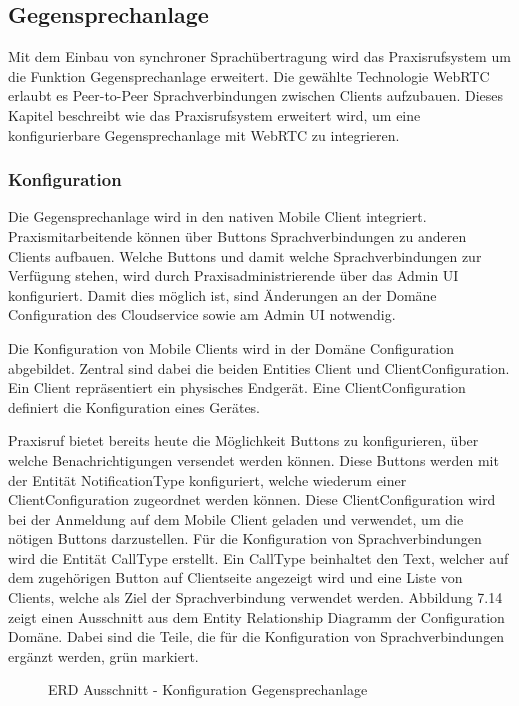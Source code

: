 \subsection{Gegensprechanlage}

Mit dem Einbau von synchroner Sprachübertragung wird das Praxisrufsystem um die Funktion Gegensprechanlage erweitert.
Die gewählte Technologie WebRTC erlaubt es Peer-to-Peer Sprachverbindungen zwischen Clients aufzubauen.
Dieses Kapitel beschreibt wie das Praxisrufsystem erweitert wird, um eine konfigurierbare Gegensprechanlage mit WebRTC zu integrieren.

\subsubsection{Konfiguration}

Die Gegensprechanlage wird in den nativen Mobile Client integriert.
Praxismitarbeitende können über Buttons Sprachverbindungen zu anderen Clients aufbauen.
Welche Buttons und damit welche Sprachverbindungen zur Verfügung stehen, wird durch Praxisadministrierende über das Admin UI konfiguriert.
Damit dies möglich ist, sind Änderungen an der Domäne Configuration des Cloudservice sowie am Admin UI notwendig.

Die Konfiguration von Mobile Clients wird in der Domäne Configuration abgebildet.
Zentral sind dabei die beiden Entities Client und ClientConfiguration.
Ein Client repräsentiert ein physisches Endgerät.
Eine ClientConfiguration definiert die Konfiguration eines Gerätes.

Praxisruf bietet bereits heute die Möglichkeit Buttons zu konfigurieren, über welche Benachrichtigungen versendet werden können.
Diese Buttons werden mit der Entität NotificationType konfiguriert, welche wiederum einer ClientConfiguration zugeordnet werden können.
Diese ClientConfiguration wird bei der Anmeldung auf dem Mobile Client geladen und verwendet, um die nötigen Buttons darzustellen.
Für die Konfiguration von Sprachverbindungen wird die Entität CallType erstellt.
Ein CallType beinhaltet den Text, welcher auf dem zugehörigen Button auf Clientseite angezeigt wird und eine Liste von Clients, welche als Ziel der Sprachverbindung verwendet werden.
Abbildung 7.14 zeigt einen Ausschnitt aus dem Entity Relationship Diagramm der Configuration Domäne.
Dabei sind die Teile, die für die Konfiguration von Sprachverbindungen ergänzt werden, grün markiert.

\begin{figure}[h]
    \centering
    \begin{minipage}[b]{0.7\textwidth}
        \caption{ERD Ausschnitt - Konfiguration Gegensprechanlage}
    \end{minipage}
\end{figure}

